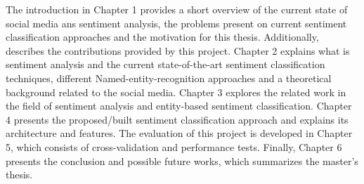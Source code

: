 The introduction in Chapter 1 provides a short overview of the current state of social media ans sentiment analysis, the problems present on current sentiment classification approaches and the motivation for this thesis. Additionally, describes the contributions provided by this project. Chapter 2 explains what is sentiment analysis and the current state-of-the-art sentiment classification techniques, different Named-entity-recognition approaches and a theoretical background related to the social media. Chapter 3 explores the related work in the field of sentiment analysis and entity-based sentiment classification. Chapter 4 presents the proposed/built sentiment classification approach and explains its architecture and features. The evaluation of this project is developed in Chapter 5, which consists of cross-validation and performance tests. Finally, Chapter 6 presents the conclusion and possible future works, which summarizes the master’s thesis.

